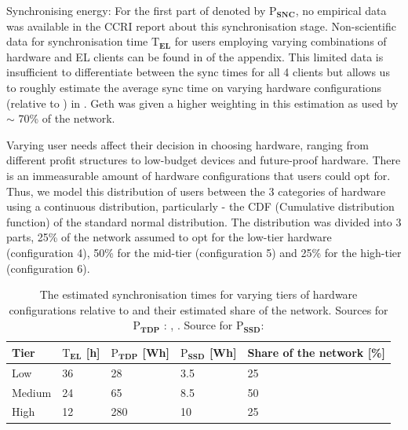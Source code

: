 Synchronising energy: 
For the first part of  denoted by $\boldsymbol{\mathrm{P}_{SNC}}$, no empirical data was available in the CCRI report about this synchronisation stage. Non-scientific data for synchronisation time $\boldsymbol{\mathrm{T}_{EL}}$ for users employing varying combinations of hardware and EL clients can be found in  of the appendix. This limited data is insufficient to differentiate between the sync times for all 4 clients but allows us to roughly estimate the average sync time on varying hardware configurations (relative to )  in . Geth was given a higher weighting in this estimation as used by  $\sim$ 70\% of the network. 

Varying user needs affect their decision in choosing hardware, ranging from different profit structures to low-budget devices and future-proof hardware. There is an immeasurable amount of hardware configurations that users could opt for. Thus, we model this distribution of users between the 3 categories of hardware using a continuous distribution, particularly - the CDF (Cumulative distribution function) of the standard normal distribution. The distribution was divided into 3 parts, 25\% of the network assumed to opt for the low-tier hardware (configuration 4), 50\% for the mid-tier (configuration 5) and 25\% for the high-tier (configuration 6). 

\begin{table}[h]
\centering
\begin{tabular}{|l|l|l|l|l|}
\hline
\textbf{Tier} & \textbf{$\boldsymbol{\mathrm{T}_{EL}}$ {[}h{]}} & \textbf{$\boldsymbol{\mathrm{P}_{TDP}}$ {[}Wh{]}} & \textbf{$\boldsymbol{\mathrm{P}_{SSD}}$ {[}Wh{]}} & \textbf{Share of the network {[}\%{]}} \\ \hline
Low    & 36 & 28  & 3.5 & 25 \\ \hline
Medium & 24 & 65  & 8.5 & 50 \\ \hline
High   & 12 & 280 & 10  & 25 \\ \hline
\end{tabular}
\caption{The estimated synchronisation times for varying tiers of hardware configurations relative to  and their estimated share of the network. Sources for $\boldsymbol{\mathrm{P}_{TDP}}$ : \cite{IntelFAQs}, \cite{AMDDatabase}. Source for $\boldsymbol{\mathrm{P}_{SSD}}$: \cite{RachanaKhamamkar2020AnalyzingDrives}}
\label{Table:SyncEnergy}
\end{table}

